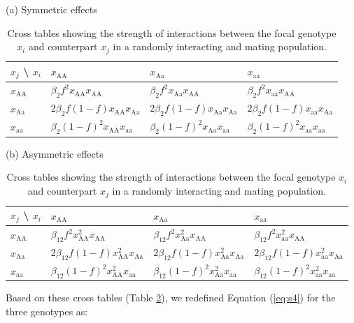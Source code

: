 \documentclass[12pt,]{article}
\begin{document}
\begin{table}[h]
\caption{Cross tables showing the strength of interactions between the focal genotype $x_i$ and counterpart $x_j$ in a randomly interacting and mating population.}
(a) Symmetric effects \\
\begin{tabular}{|l|lll|}
\hline
$x_j$ \textbackslash{} $x_i$ & $x_\mathrm{AA}$ & $x_\mathrm{Aa}$ & $x_\mathrm{aa}$ \\ \hline
$x_\mathrm{AA}$ & $\beta_2 f^2x_\mathrm{AA}x_\mathrm{AA}$ & $\beta_2f^2x_\mathrm{Aa}x_\mathrm{AA}$ & $\beta_2f^2x_\mathrm{aa}x_\mathrm{AA}$ \\
$x_\mathrm{Aa}$ & $2\beta_2f(1-f)x_\mathrm{AA}x_\mathrm{Aa}$ & $2\beta_2f(1-f)x_\mathrm{Aa}x_\mathrm{Aa}$ & $2\beta_2f(1-f)x_\mathrm{aa}x_\mathrm{Aa}$ \\
$x_\mathrm{aa}$ & $\beta_2(1-f)^2x_\mathrm{AA}x_\mathrm{aa}$ & $\beta_2(1-f)^2x_\mathrm{Aa}x_\mathrm{aa}$ & $\beta_2(1-f)^2x_\mathrm{aa}x_\mathrm{aa}$ \\ \hline
\end{tabular}

\vspace*{5mm}

(b) Asymmetric effects \\
\begin{tabular}{|l|lll|}
\hline
$x_j$ \textbackslash{} $x_i$ & $x_\mathrm{AA}$ & $x_\mathrm{Aa}$ & $x_\mathrm{aa}$ \\ \hline
$x_\mathrm{AA}$ & $\beta_{12}f^2x^2_\mathrm{AA}x_\mathrm{AA}$  &  $\beta_{12}f^2x^2_\mathrm{Aa}x_\mathrm{AA}$  & $\beta_{12}f^2x^2_\mathrm{aa}x_\mathrm{AA}$ \\
$x_\mathrm{Aa}$ & $2\beta_{12}f(1-f)x^2_\mathrm{AA}x_\mathrm{Aa}$ & $2\beta_{12}f(1-f)x^2_\mathrm{Aa}x_\mathrm{Aa}$ &  $2\beta_{12}f(1-f)x^2_\mathrm{aa}x_\mathrm{Aa}$ \\
$x_\mathrm{aa}$ & $\beta_{12}(1-f)^2x^2_\mathrm{AA}x_\mathrm{aa}$ & $\beta_{12}(1-f)^2x^2_\mathrm{Aa}x_\mathrm{aa}$ & $\beta_{12}(1-f)^2x^2_\mathrm{aa}x_\mathrm{aa}$ \\ \hline
\end{tabular}
      \label{tableS2:intTable}
\end{table}

\noindent
Based on these cross tables (Table \ref{tableS2:intTable}), we redefined Equation (\ref{eq:s4}) for the three genotypes as: 
\end{document}
